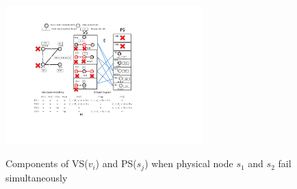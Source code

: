 \begin{figure}
\centering
\includegraphics[width=3in]{Fig/StarRepresentationTwoFailure}\\
  \caption{Components of VS($v_i$) and PS($s_j$) when physical node $s_1$ and $s_2$ fail simultaneously}\label{fig:StarRepresentationTwoFailure}
\end{figure}



